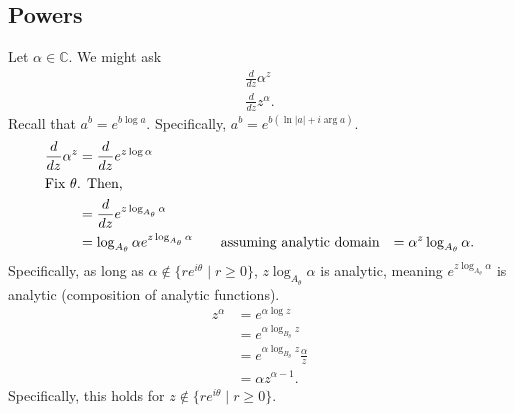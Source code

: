 \documentclass[10pt]{extarticle}
\newcommand{\C}{\mathbb{C}}
\begin{document}
  \subsection{Powers}%
  Let $\alpha \in \C$. We might ask
  \begin{align*}
    \frac{d}{dz}\alpha^{z}\\
    \frac{d}{dz}z^{\alpha}.
  \end{align*}
  Recall that $a^b = e^{b \log a}$. Specifically, $a^b = e^{b (\ln|a| + i\arg a)}$.
  \begin{align*}
    \frac{d}{dz}\alpha^{z} &= \frac{d}{dz}e^{z\log \alpha}\\
    \intertext{Fix $\theta$. Then,}
                           &= \frac{d}{dz}e^{z\log_{A_{\theta}}\alpha}\\
                           &= \log_{A_{\theta}}\alpha e^{z\log_{A_{\theta}}\alpha} \tag*{assuming analytic domain}
                           &= \alpha^{z}\log_{A_{\theta}}\alpha.
  \end{align*}
  Specifically, as long as $\alpha \notin \{re^{i\theta}\mid r \geq 0\}$, $z\log_{A_{\theta}}\alpha$ is analytic, meaning $e^{z\log_{A_{\theta}}\alpha}$ is analytic (composition of analytic functions).
  \begin{align*}
    z^{\alpha} &= e^{\alpha \log z}\\
               &= e^{\alpha \log_{B_{\theta}} z}\\
               &= e^{\alpha \log_{B_{\theta}}z} \frac{\alpha}{z}\\
               &= \alpha z^{\alpha - 1}.
  \end{align*}
  Specifically, this holds for $z\notin \{re^{i\theta}\mid r\geq 0\}$.
\end{document}
